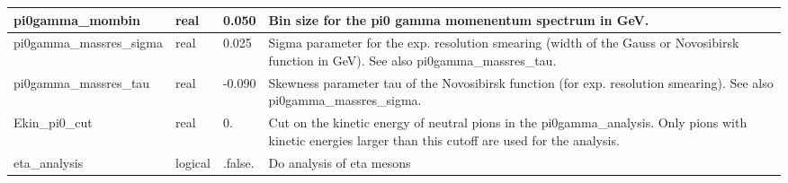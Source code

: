 \documentclass{article}
\begin{document}
\begin{longtable}{llll}
\midrule
pi0gamma\_mombin & \begin{minipage}[t]{2cm}real\end{minipage} & \begin{minipage}[t]{2cm}0.050\end{minipage} & \begin{minipage}[t]{12cm}Bin size for the pi0 gamma momenentum spectrum in GeV.\end{minipage}\\*
\midrule
pi0gamma\_massres\_sigma & \begin{minipage}[t]{2cm}real\end{minipage} & \begin{minipage}[t]{2cm}0.025\end{minipage} & \begin{minipage}[t]{12cm}Sigma parameter for the exp. resolution smearing (width of the Gauss or Novosibirsk function in GeV). See also pi0gamma\_massres\_tau.\end{minipage}\\*
\midrule
pi0gamma\_massres\_tau & \begin{minipage}[t]{2cm}real\end{minipage} & \begin{minipage}[t]{2cm}-0.090\end{minipage} & \begin{minipage}[t]{12cm}Skewness parameter tau of the Novosibirsk function (for exp. resolution smearing). See also pi0gamma\_massres\_sigma.\end{minipage}\\*
\midrule
Ekin\_pi0\_cut & \begin{minipage}[t]{2cm}real\end{minipage} & \begin{minipage}[t]{2cm}0.\end{minipage} & \begin{minipage}[t]{12cm}Cut on the kinetic energy of neutral pions in the pi0gamma\_analysis. Only pions with kinetic energies larger than this cutoff are used for the analysis.\end{minipage}\\*
\midrule
eta\_analysis & \begin{minipage}[t]{2cm}logical\end{minipage} & \begin{minipage}[t]{2cm}.false.\end{minipage} & \begin{minipage}[t]{12cm}Do analysis of eta mesons\end{minipage}\\*

\end{longtable}
\end{document}
